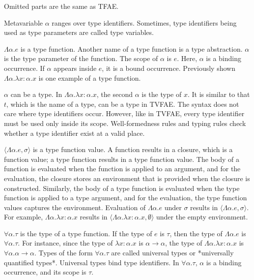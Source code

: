 Omitted parts are the same as TFAE.

Metavariable $\alpha$ ranges over type identifiers. Sometimes, type
identifiers being used as type parameters are called type variables.

$\Lambda\alpha.e$ is a type function. Another name of a type function is a
type abstraction. $\alpha$ is the type parameter of the function. The scope of
$\alpha$ is $e$. Here, $\alpha$ is a binding occurrence. If $\alpha$
appears inside $e$, it is a bound occurrence. Previously shown
$\Lambda\alpha.\lambda x:\alpha.x$ is one example of a type function.

$\alpha$ can be a type. In $\Lambda\alpha.\lambda x:\alpha.x$, the second
$\alpha$ is the type of $x$. It is similar to that $t$, which is the name
of a type, can be a type in TVFAE. The syntax does not care where type
identifiers occur. However, like in TVFAE, every type identifier must be used
only inside its scope. Well-formedness rules and typing rules check whether a
type identifier exist at a valid place.

$\langle\Lambda\alpha.e,\sigma\rangle$ is a type function value. A function
results in a closure, which is a function value; a type function results in a
type function value. The body of a function is evaluated when the function is
applied to an argument, and for the evaluation, the closure stores an
environment that is provided when the closure is constructed. Similarly, the
body of a type function is evaluated when the type function is applied to a type
argument, and for the evaluation, the type function values captures the
environment. Evaluation of $\Lambda\alpha.e$ under $\sigma$ results in
$\langle\Lambda\alpha.e,\sigma\rangle$. For example, \(\Lambda\alpha.\lambda
x:\alpha.x\) results in \(\langle\Lambda\alpha.\lambda
x:\alpha.x,\emptyset\rangle\) under the empty environment.

$\forall\alpha.\tau$ is the type of a type function. If the type of $e$ is
$\tau$, then the type of $\Lambda\alpha.e$ is $\forall\alpha.\tau$. For
instance, since the type of $\lambda x:\alpha.x$ is
$\alpha\rightarrow\alpha$, the type of $\Lambda\alpha.\lambda x:\alpha.x$ is
$\forall\alpha.\alpha\rightarrow\alpha$. Types of the form
$\forall\alpha.\tau$ are called universal types or *universally quantified
types*. Universal types bind type identifiers. In $\forall\alpha.\tau$,
$\alpha$ is a binding occurrence, and its scope is $\tau$.

